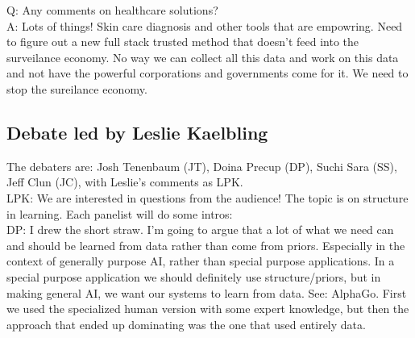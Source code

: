 Q: Any comments on healthcare solutions?  \\

A: Lots of things! Skin care diagnosis and other tools that are empowring. Need to figure out a new full stack trusted method that doesn't feed into the surveilance economy. No way we can collect all this data and work on this data and not have the powerful corporations and governments come for it. We need to stop the sureilance economy. 


\subsection{Debate led by Leslie Kaelbling}

The debaters are: Josh Tenenbaum (JT), Doina Precup (DP), Suchi Sara (SS), Jeff Clun (JC), with Leslie's comments as LPK. \\


LPK: We are interested in questions from the audience! The topic is on structure in learning. Each panelist will do some intros: \\

DP: I drew the short straw. I'm going to argue that a lot of what we need can and should be learned from data rather than come from priors. Especially in the context of generally purpose AI, rather than special purpose applications. In a special purpose application we should definitely use structure/priors, but in making general AI, we want our systems to learn from data. See: AlphaGo. First we used the specialized human version with some expert knowledge, but then the approach that ended up dominating was the one that used entirely data. \\

